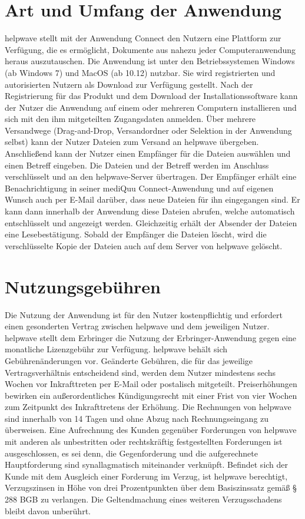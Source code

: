 \documentclass[10pt]{article}
\begin{document}
\section{Art und Umfang der Anwendung}
helpwave stellt mit der Anwendung Connect den Nutzern eine Plattform zur Verfügung, die es ermöglicht, Dokumente aus
nahezu jeder Computeranwendung heraus auszutauschen. Die Anwendung ist unter den Betriebssystemen Windows (ab
Windows 7) und MacOS (ab 10.12) nutzbar. Sie wird registrierten und autorisierten Nutzern als Download zur Verfügung
gestellt.
Nach der Registrierung für das Produkt und dem Download der Installationssoftware kann der Nutzer die Anwendung auf
einem oder mehreren Computern installieren und sich mit den ihm mitgeteilten Zugangsdaten anmelden. Über mehrere Versandwege (Drag-and-Drop, Versandordner oder Selektion in der Anwendung selbst) kann der Nutzer Dateien zum Versand
an helpwave übergeben. Anschließend kann der Nutzer einen Empfänger für die Dateien auswählen und einen Betreff eingeben. Die Dateien und der Betreff werden im Anschluss verschlüsselt und an den helpwave-Server übertragen. Der Empfänger
erhält eine Benachrichtigung in seiner mediQuu Connect-Anwendung und auf eigenen Wunsch auch per E-Mail darüber, dass
neue Dateien für ihn eingegangen sind. Er kann dann innerhalb der Anwendung diese Dateien abrufen, welche automatisch
entschlüsselt und angezeigt werden. Gleichzeitig erhält der Absender der Dateien eine Lesebestätigung. Sobald der Empfänger die Dateien löscht, wird die verschlüsselte Kopie der Dateien auch auf dem Server von helpwave gelöscht.

\section{Nutzungsgebühren}
Die Nutzung der Anwendung ist für den Nutzer kostenpflichtig und erfordert einen gesonderten Vertrag zwischen helpwave und dem jeweiligen Nutzer.
helpwave stellt dem Erbringer die Nutzung der Erbringer-Anwendung gegen eine monatliche Lizenzgebühr zur Verfügung. helpwave behält sich Gebührenänderungen vor. Geänderte Gebühren, die für das jeweilige Vertragsverhältnis entscheidend sind, werden dem Nutzer mindestens sechs Wochen vor Inkrafttreten per E-Mail oder postalisch mitgeteilt. Preiserhöhungen bewirken ein außerordentliches Kündigungsrecht mit einer Frist von vier Wochen zum Zeitpunkt des Inkrafttretens der Erhöhung. Die Rechnungen von helpwave sind innerhalb von 14 Tagen und ohne Abzug nach Rechnungseingang zu überweisen. Eine Aufrechnung des Kunden gegenüber Forderungen von helpwave mit anderen als unbestritten oder rechtskräftig festgestellten Forderungen ist ausgeschlossen, es sei denn, die Gegenforderung und die aufgerechnete Hauptforderung sind synallagmatisch miteinander verknüpft. Befindet sich der Kunde mit dem Ausgleich einer Forderung im Verzug, ist helpwave berechtigt, Verzugszinsen in Höhe von drei Prozentpunkten über dem Basiszinssatz gemäß § 288 BGB zu verlangen. Die Geltendmachung eines weiteren Verzugsschadens bleibt davon unberührt.
\end{document}
